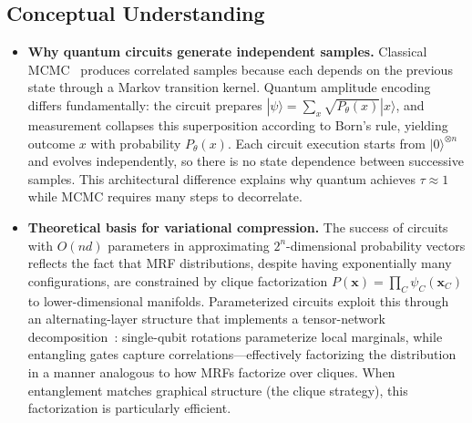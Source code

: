 \documentclass[conference,10pt]{IEEEtran}
\begin{document}
\subsection{Conceptual Understanding}
\begin{itemize}[leftmargin=*, topsep=0pt, partopsep=0pt, itemsep=2pt, parsep=0pt]
    \item \textbf{Why quantum circuits generate independent samples.} Classical MCMC~\cite{brooks2011handbook} produces correlated samples because each depends on the previous state through a Markov transition kernel. Quantum amplitude encoding differs fundamentally: the circuit prepares $|\psi\rangle = \sum_x \sqrt{P_\theta(x)}|x\rangle$, and measurement collapses this superposition according to Born's rule, yielding outcome $x$ with probability $P_\theta(x)$. Each circuit execution starts from $|0\rangle^{\otimes n}$ and evolves independently, so there is no state dependence between successive samples. This architectural difference explains why quantum achieves $\tau \approx 1$ while MCMC requires many steps to decorrelate.
    \item \textbf{Theoretical basis for variational compression.} The success of circuits with $O(nd)$ parameters in approximating $2^n$-dimensional probability vectors reflects the fact that MRF distributions, despite having exponentially many configurations, are constrained by clique factorization $P(\mathbf{x}) = \prod_C \psi_C(\mathbf{x}_C)$ to lower-dimensional manifolds. Parameterized circuits exploit this through an alternating-layer structure that implements a tensor-network decomposition~\cite{huggins2019towards}: single-qubit rotations parameterize local marginals, while entangling gates capture correlations---effectively factorizing the distribution in a manner analogous to how MRFs factorize over cliques. When entanglement matches graphical structure (the clique strategy), this factorization is particularly efficient.
\end{itemize}
\end{document}
